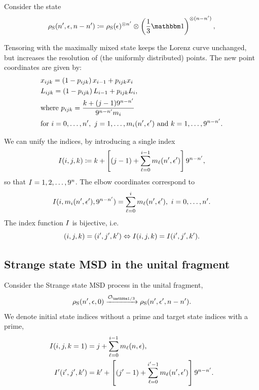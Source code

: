 Consider the state 
\begin{equation*}
\noisys(\tt, \epsilon, \nn-\tt) \coloneqq \noisys(\epsilon)\too{\tt} \otimes \left( \frac{1}{3}\id \right)\too{(\nn-\tt)},
\end{equation*}

Tensoring with the maximally mixed state keeps the Lorenz curve unchanged, but increases the resolution of (the uniformly distributed) points.
The new point coordinates are given by:
\begin{align}
    &x_{ijk} = \left( 1-p_{ijk}\right) x_{i-1} + p_{ijk} x_{i} \label{eq:lcsu_xcoord}\\
    &L_{ijk} = \left( 1-p_{ijk} \right) L_{i-1} + p_{ijk} L_{i}, \label{eq:lcsu_lcoord}\\
    &\text{where } p_{ijk} = \frac{k + (j-1)9^{n-n'}}{9^{n-n'} m_{i}} \nonumber\\
    &\text{for } i=0,\dots,n',\ j = 1,\dots,m_{i}(n', \epsilon') \text{ and } k = 1,\dots,9^{n-n'}. \nonumber
\end{align}

We can unify the indices, by introducing a single index
\begin{equation}
    I(i,j,k) \coloneqq k + \left[ (j-1) + \sum_{\ell=0}^{i-1} m_{\ell}(n', \epsilon') \right]9^{n-n'},
\end{equation}
so that $I=1,2,\dots, 9^{n}$.
The elbow coordinates correspond to 
\begin{equation}
	I(i, m_{i}(n', \epsilon'), 9^{n-n'}) = \sum_{\ell=0}^{i} m_{\ell}(n', \epsilon'),\ i= 0,\dots,n'.
\end{equation}
The index function $I$ is bijective, i.e.
\begin{equation}
	(i,j,k) = (i',j',k') \Leftrightarrow I(i,j,k) = I(i',j',k').
\end{equation}

\subsection{Strange state MSD in the unital fragment}\label{app:lc_compare}
Consider the Strange state MSD process in the unital fragment,
\begin{equation}\label{eq:su_conversion}
    \noisys(\tt, \epsilon, 0) \xrightarrow{\mathcal{O}_{\id/3}} \noisys(\tt, \epsilon', \nn-\tt).
\end{equation}
We denote initial state indices without a prime and target state indices with a prime,
\begin{align}
    I(i,j,k=1) &= j + \sum_{\ell=0}^{i-1} m_{\ell}(n, \epsilon), \\
    I'(i',j',k') &= k' + \left[ (j'-1) + \sum_{\ell=0}^{i'-1} m_{\ell}(n', \epsilon') \right]9^{n-n'}.
\end{align}

